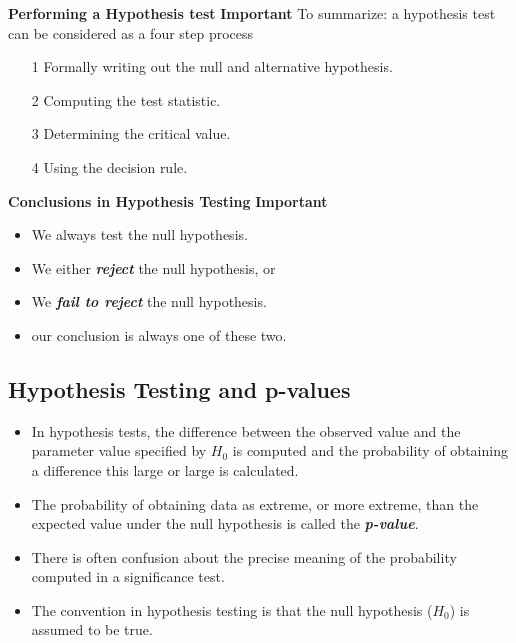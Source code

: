 \documentclass[]{report}
\begin{document}
{{{\begin{framed}
\textbf{Performing a Hypothesis test}
\textbf{Important}
To summarize: a hypothesis test can be considered as a four step process
\begin{itemize}
\item[1] Formally writing out the null and alternative hypothesis.
\item[2] Computing the test statistic.
\item[3] Determining the critical value.
\item[4] Using the decision rule.
\end{itemize}
\end{framed}


\textbf{Conclusions in Hypothesis Testing}
\textbf{Important}
\begin{itemize}
\item We always test the null hypothesis.
\item We either \textbf{\emph{reject}} the null hypothesis, or
\item We \textbf{\emph{ fail to reject}} the null hypothesis.
\item our conclusion is always one of these two.
\end{itemize}



\newpage


\subsection{Hypothesis Testing and p-values}
\begin{itemize}
\item In hypothesis tests, the difference between the observed value and the parameter value specified by $H_0$ is computed and the probability of obtaining a difference this large or large is calculated.
\item The probability of obtaining data as extreme, or more extreme, than the expected value under the null hypothesis is called the \textbf{\emph{p-value}}.

\item There is often confusion about the precise meaning of the probability computed in a significance test.\item  The convention in hypothesis testing is that the null hypothesis ($H_0$) is assumed to be true. 


\end{itemize}}}}
\end{document}
